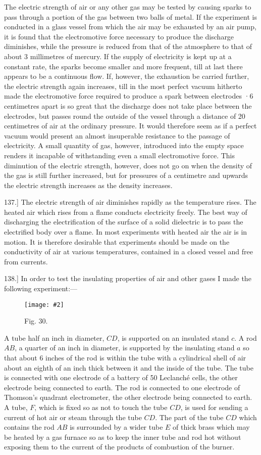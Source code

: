 \documentclass[12pt,oneside]{book}[2021/10/04]
\newcommand{\article}[1]{\phantomsection \label{art:#1}{#1.]}}
\newcommand{\widefig}[3]{
\begin{figure}[ht!]
\centering
\texttt{[image: \#2]}
\caption*{\small #3}
\end{figure}}
\newcommand{\¬}{\hphantom{0}}
\begin{document}
The electric strength of air or any other gas may be tested by
causing sparks to pass through a portion of the gas between two
balls of metal. If the experiment is conducted in a glass vessel
from which the air may be exhausted by an air pump, it is found
that the electromotive force necessary to produce the discharge
diminishes, while the pressure is reduced from that of the atmosphere
to that of about 3 millimetres of mercury. If the supply of
electricity is kept up at a constant rate, the sparks become smaller
and more frequent, till at last there appears to be a continuous flow.
If, however, the exhaustion be carried further, the electric strength
again increases, till in the most perfect vacuum hitherto made the
electromotive force required to produce a spark between electrodes
·6 centimetres apart is so great that the discharge does not take
place between the electrodes, but passes round the outside of the
vessel through a distance of 20 centimetres of air at the ordinary
pressure. It would therefore seem as if a perfect vacuum would
present an almost insuperable resistance to the passage of electricity.
A small quantity of gas, however, introduced into the empty space
renders it incapable of withstanding even a small electromotive
force. This diminution of the electric strength, however, does not
go on when the density of the gas is still further increased, but for
pressures of a centimetre and upwards the electric strength increases
as the density increases.

\article{137} The electric strength of air diminishes rapidly as the temperature
rises. The heated air which rises from a flame conducts
electricity freely. The best way of discharging the electrification
of the surface of a solid dielectric is to pass the electrified body
over a flame. In most experiments with heated air the air is in
motion. It is therefore desirable that experiments should be made
on the conductivity of air at various temperatures, contained in a
closed vessel and free from currents.

\article{138} In order to test the insulating properties of air and other
gases I made the following experiment:---

\widefig{0.89}{132.png}{Fig. 30.}
A tube half an inch in diameter, \(CD\), is supported on an insulated
stand \(c\). A rod \(AB\), a quarter of an inch in diameter, is supported
by the insulating stand \(a\) so that about 6 inches of the rod is within
the tube with a cylindrical shell of air about an eighth of an inch
thick between it and the inside of the tube. The tube is connected
with one electrode of a battery of 50 Leclanché cells, the other
electrode being connected to earth. The rod is connected to one
electrode of Thomson's quadrant electrometer, the other electrode
being connected to earth. A tube, \(F\), which is fixed so as not to
touch the tube \(CD\), is used for sending a current of hot air or steam
through the tube \(CD\). The part of the tube \(CD\) which contains the
rod \(AB\) is surrounded by a wider tube \(E\) of thick brass which may
be heated by a gas furnace so as to keep the inner tube and rod hot
without exposing them to the current of the products of combustion
of the burner.
\end{document}
